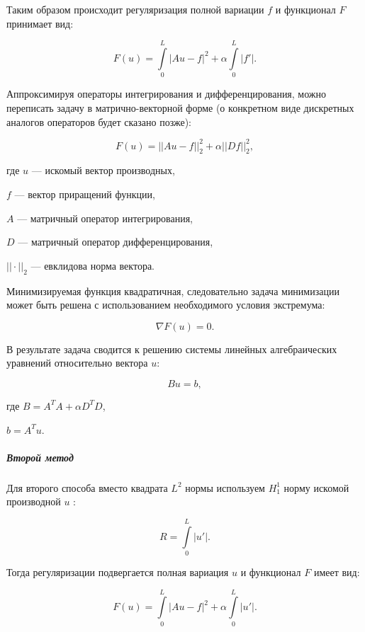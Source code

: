 Таким образом происходит регуляризация полной вариации $f$ и функционал $F$ принимает вид:

\begin{equation}
F(u) = \int\limits_0^L |A u - f|^2 + \alpha \int\limits_0^L |f'|.
\end{equation}

Аппроксимируя операторы интегрирования и дифференцирования, можно переписать задачу в матрично-векторной форме (о конкретном виде дискретных аналогов операторов будет сказано позже):

\begin{equation}
F(u) = ||A u - f||_2^2 + \alpha ||D f||_2^2,
\end{equation}

где $u$ --- искомый вектор производных,\par 
$f$ --- вектор приращений функции,\par 
$A$ --- матричный оператор интегрирования,\par 
$D$ --- матричный оператор дифференцирования,\par 
$||\cdot||_2$ --- евклидова норма вектора.

Минимизируемая функция квадратичная, следовательно задача минимизации может быть решена с использованием необходимого условия экстремума:

\begin{equation}
\nabla F(u) = 0.
\end{equation}

В результате задача сводится к решению системы линейных алгебраических уравнений относительно вектора $u$:

\begin{equation}
B u = b,
\end{equation}

где $B = A^T A + \alpha D^T D$,\par $b = A^T u$.

\subparagraph{Второй метод}

Для второго способа вместо квадрата $L^2$ нормы используем $H^1_1$ норму искомой производной $u$ \cite{tvr}:

\begin{equation}
R = \int\limits_0^L |u'|.
\end{equation}

Тогда регуляризации подвергается полная вариация $u$ и функционал $F$ имеет вид:

\begin{equation}
F(u) = \int\limits_0^L |A u - f|^2 + \alpha \int\limits_0^L |u'|.
\end{equation}

